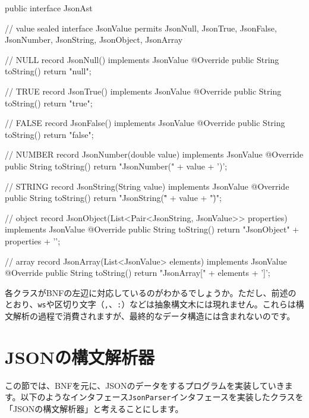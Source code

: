 \begin{codescreen}{}
public interface JsonAst {
    // value
    sealed interface JsonValue permits 
        JsonNull, JsonTrue, JsonFalse, 
        JsonNumber, JsonString, 
        JsonObject, JsonArray {}

    // NULL
    record JsonNull() implements JsonValue {
        @Override
        public String toString() {
            return "null";
        }
    }

    // TRUE
    record JsonTrue() implements JsonValue {
        @Override
        public String toString() {
            return "true";
        }
    }

    // FALSE
    record JsonFalse() implements JsonValue {
        @Override
        public String toString() {
            return "false";
        }
    }

    // NUMBER
    record JsonNumber(double value) implements JsonValue {
        @Override
        public String toString() {
            return "JsonNumber(" + value + ')';
        }
    }

    // STRING
    record JsonString(String value) implements JsonValue {
        @Override
        public String toString() {
            return "JsonString(\"" + value + "\")";
        }
    }

    // object
    record JsonObject(List<Pair<JsonString, JsonValue>> properties) 
        implements JsonValue {
        @Override
        public String toString() {
            return "JsonObject{" + properties + '}';
        }
    }

    // array
    record JsonArray(List<JsonValue> elements) 
        implements JsonValue {
        @Override
        public String toString() {
            return "JsonArray[" + elements + ']';
        }
    }
}
\end{codescreen}


\enlargethispage{\baselineskip}各クラスがBNFの左辺に対応しているのがわかるでしょうか。ただし、前述のとおり、\texttt{ws}や区切り文字（\texttt{,}、\texttt{:}）などは抽象構文木には現れません。これらは構文解析の過程で消費されますが、最終的なデータ構造には含まれないのです。

\section{JSONの構文解析器}

この節では、BNFを元に、JSONのデータをするプログラムを実装していきます。以下のようなインタフェース\texttt{JsonParser}インタフェースを実装したクラスを「JSONの構文解析器」と考えることにします。

